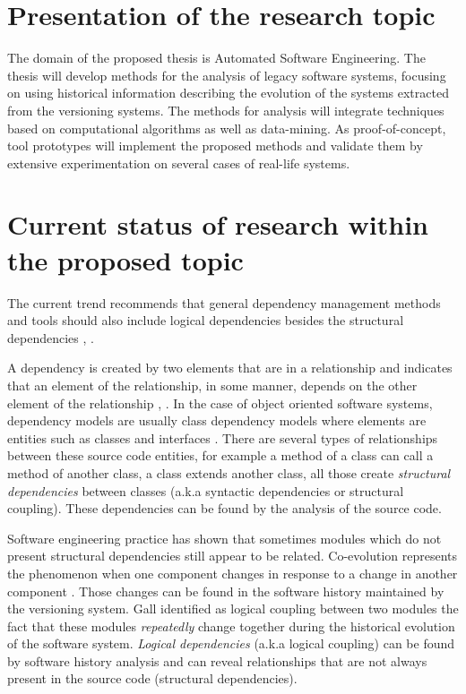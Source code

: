 \documentclass[12pt,a4paper,oneside]{report}
\begin{document}
{\let\clearpage\relax \chapter{Presentation of the research topic}}
The domain of the proposed thesis is Automated Software Engineering. The thesis will develop methods for the analysis of legacy software systems, focusing on using historical information describing the evolution of the systems extracted from the versioning systems. 
The methods for analysis will integrate techniques based on computational algorithms as well as data-mining. As proof-of-concept, tool prototypes will implement the proposed methods and validate them by extensive experimentation on several cases of real-life systems.

{\let\clearpage\relax \chapter{Current status of research within the proposed topic}}
The current trend recommends that general dependency management methods and tools should also include logical dependencies besides the structural dependencies \cite{Oliva:2011:ISL:2067853.2068086}, \cite{DBLP:journals/jss/AjienkaC17}. 

A dependency is created by two elements that are in a relationship and indicates that an element of the relationship, in some manner, depends on the other element of the relationship \cite{Booch:2004:OAD:975416}, \cite{Cataldo2009SoftwareDW}. In the case of object oriented software systems, dependency models are usually class dependency models where elements are entities such as classes and interfaces \cite{Sangal:2005:UDM:1094811.1094824}. There are several types of relationships between these source code entities, for example a method of a class can call a method of another class, a class extends another class, all those create  \textit{structural dependencies} between classes (a.k.a syntactic dependencies or structural coupling). These dependencies can be found by the analysis of the source code.

Software engineering practice has shown that sometimes modules which do not present structural dependencies still appear to be related. Co-evolution represents the phenomenon when one component changes in response to a change in another component \cite{Yu:2007:UCC:1231330.1231370}. Those changes can be found in the software history maintained by the versioning system. Gall \cite{Gall:1998:DLC:850947.853338} identified as logical coupling between two modules the fact that these modules  \textit{repeatedly} change together during the historical evolution of the software system. 
 \textit{Logical dependencies} (a.k.a logical coupling) can be found by software history analysis and can reveal relationships that are not always present in the source code (structural dependencies).  
\end{document}
